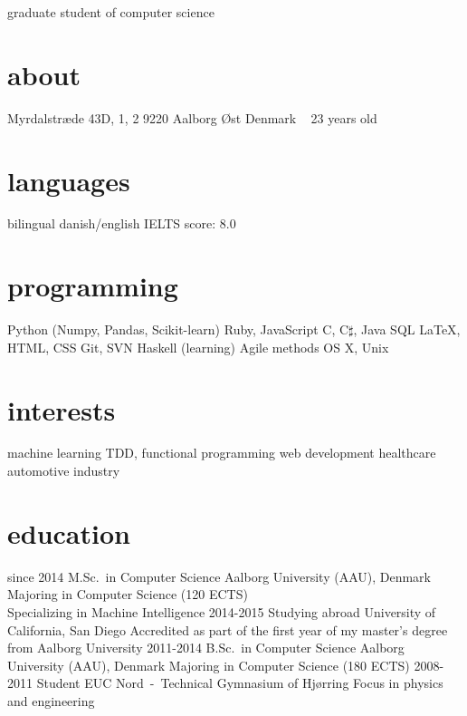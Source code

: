 \documentclass{afriggeri-cv/friggeri-cv}
\newcommand{\aau}{%
  Aalborg University (AAU), Denmark
}
\begin{document}
       {graduate student of computer science}

\begin{aside}
  \section{about}
    Myrdalstræde 43D, 1, 2
    9220 Aalborg Øst
    Denmark
    ~
    23 years old
  \section{languages}
    bilingual danish/english
    IELTS score: 8.0
  \section{programming}
    Python (Numpy, Pandas, Scikit-learn)
    Ruby, JavaScript
    C, C$\sharp$, Java
    SQL
    \LaTeX, HTML, CSS
    Git, SVN
    Haskell (learning)
    Agile methods
    OS X, Unix
  \section{interests}
    machine learning
    TDD, functional programming
    web development
    healthcare
    automotive industry
\end{aside}

\section{education}

\begin{entrylist}
  \entry
    {since 2014}
    {M.Sc.\ {\normalfont in Computer Science}}
    {\aau}
    {Majoring in Computer Science (120 ECTS)\\
    Specializing in Machine Intelligence}
  \entry
    {2014-2015}
    {Studying abroad}
    {University of California, San Diego}
    {Accredited as part of the first year of my master's degree from Aalborg University}
  \entry
    {2011-2014}
    {B.Sc.\ {\normalfont in Computer Science}}
    {\aau}
    {Majoring in Computer Science (180 ECTS)}
  \entry
    {2008-2011}
    {Student}
    {EUC Nord~-~Technical Gymnasium of Hjørring}
    {Focus in physics and engineering}
\end{entrylist}
\end{document}
